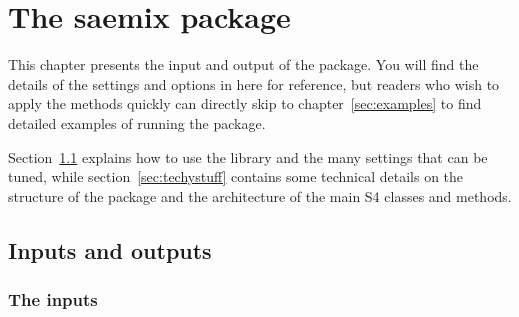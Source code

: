 \chapter{The {\sf saemix} package} \label{sec:package}

This chapter presents the input and output of the \saemix package. You will find the details of the settings and options in here for reference, but readers who wish to apply the methods quickly can directly skip to chapter~\ref{sec:examples} to find detailed examples of running the package.

Section~\ref{sec:usingsaemix} explains how to use the \saemix library and the many settings that can be tuned, while section~\ref{sec:techystuff} contains some technical details on the structure of the package and the architecture of the main S4 classes and methods.

\section{Inputs and outputs} \label{sec:usingsaemix}

\subsection{The inputs}

